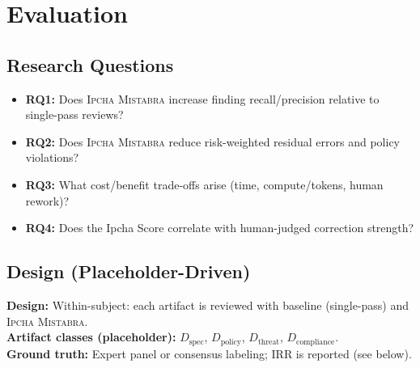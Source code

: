 \documentclass[11pt,a4paper]{article}
\newcommand{\methodname}{\textsc{Ipcha Mistabra}}
\begin{document}
\section{Evaluation}

\subsection{Research Questions}
\begin{itemize}
  \item \textbf{RQ1:} Does \methodname{} increase finding recall/precision relative to single-pass reviews?
  \item \textbf{RQ2:} Does \methodname{} reduce risk-weighted residual errors and policy violations?
  \item \textbf{RQ3:} What cost/benefit trade-offs arise (time, compute/tokens, human rework)?
  \item \textbf{RQ4:} Does the Ipcha Score correlate with human-judged correction strength?
\end{itemize}

\subsection{Design (Placeholder-Driven)}
\textbf{Design:} Within-subject: each artifact is reviewed with baseline (single-pass) and \methodname{}.\\
\textbf{Artifact classes (placeholder):} $D_{\text{spec}}$, $D_{\text{policy}}$, $D_{\text{threat}}$, $D_{\text{compliance}}$.\\
\textbf{Ground truth:} Expert panel or consensus labeling; IRR is reported (see below).
\end{document}
